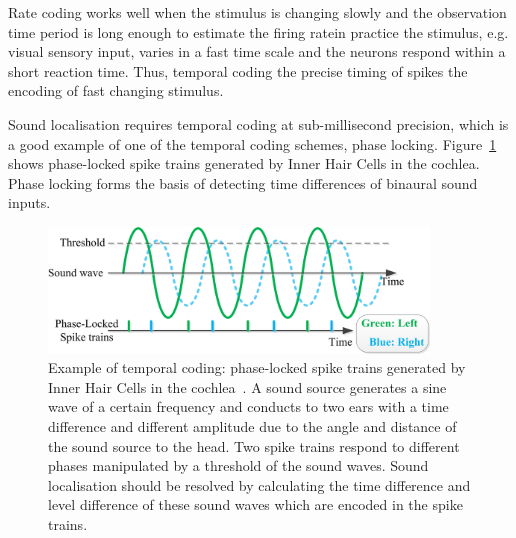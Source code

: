 Rate coding works well when the stimulus is changing slowly and the observation time period is long enough to estimate the firing rate\DIFdelbegin {}\DIFdelend \DIFaddbegin {}\DIFaddend in practice the stimulus, e.g. visual sensory input, varies in a fast time scale and the neurons respond within a short reaction time.
Thus, temporal coding \DIFdelbegin {}\DIFdelend \DIFaddbegin {}\DIFaddend the precise timing of spikes \DIFdelbegin {}\DIFdelend \DIFaddbegin {}\DIFaddend the encoding of \DIFaddbegin {}\DIFaddend fast changing stimulus.

Sound localisation requires temporal coding at sub-millisecond precision, which is a good example of one of the temporal coding schemes, phase locking.
Figure~\ref{Fig:audio_fibre} shows phase-locked spike trains generated by Inner Hair Cells in the cochlea.
Phase locking forms the basis
of detecting time differences of binaural sound inputs.
\begin{figure}[bt]
	\centering
	\includegraphics[width=0.9\textwidth]{pics_snn/phaselocking.png}
	\caption{Example of temporal coding: phase-locked spike trains generated by Inner Hair Cells in the cochlea~\citep{liu2013modeling}.
	A sound source generates a sine wave of a certain frequency and conducts to two ears with a time difference and different amplitude due to the angle and distance of the sound source to the head.
	Two spike trains respond to different phases manipulated by a threshold of the sound waves.
	Sound localisation should be resolved by calculating the time difference and level difference of these sound waves which are encoded in the spike trains.
    }
	\label{Fig:audio_fibre}
\end{figure}

